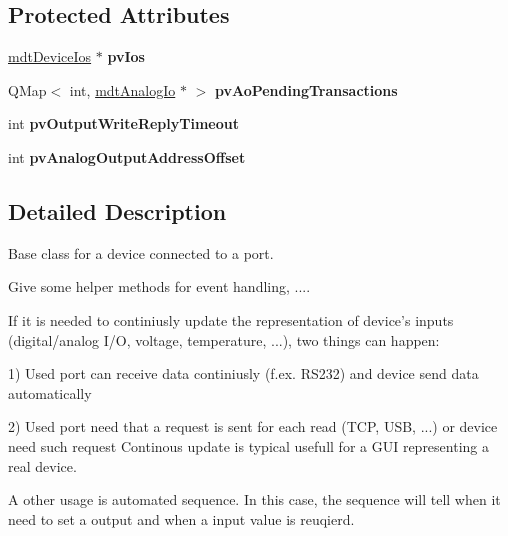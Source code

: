 \subsection*{Protected Attributes}
\begin{DoxyCompactItemize}
\item 
\hypertarget{classmdt_device_aa84e01b13f98fc35476a2654f1c8d2b3}{
\hyperlink{classmdt_device_ios}{mdtDeviceIos} $\ast$ {\bfseries pvIos}}
\label{classmdt_device_aa84e01b13f98fc35476a2654f1c8d2b3}

\item 
\hypertarget{classmdt_device_af0f2dce75ed1ac3471b6c26fca146747}{
QMap$<$ int, \hyperlink{classmdt_analog_io}{mdtAnalogIo} $\ast$ $>$ {\bfseries pvAoPendingTransactions}}
\label{classmdt_device_af0f2dce75ed1ac3471b6c26fca146747}

\item 
\hypertarget{classmdt_device_a0b2d5512a223c9cd1e51908c4d9d45a4}{
int {\bfseries pvOutputWriteReplyTimeout}}
\label{classmdt_device_a0b2d5512a223c9cd1e51908c4d9d45a4}

\item 
\hypertarget{classmdt_device_a50a6824fe8b9ae2a7e7c56b8e0686a76}{
int {\bfseries pvAnalogOutputAddressOffset}}
\label{classmdt_device_a50a6824fe8b9ae2a7e7c56b8e0686a76}

\end{DoxyCompactItemize}


\subsection{Detailed Description}
Base class for a device connected to a port. 

Give some helper methods for event handling, ....

If it is needed to continiusly update the representation of device's inputs (digital/analog I/O, voltage, temperature, ...), two things can happen:
\begin{DoxyItemize}
\item 1) Used port can receive data continiusly (f.ex. RS232) and device send data automatically
\item 2) Used port need that a request is sent for each read (TCP, USB, ...) or device need such request Continous update is typical usefull for a GUI representing a real device.
\end{DoxyItemize}

A other usage is automated sequence. In this case, the sequence will tell when it need to set a output and when a input value is reuqierd.

